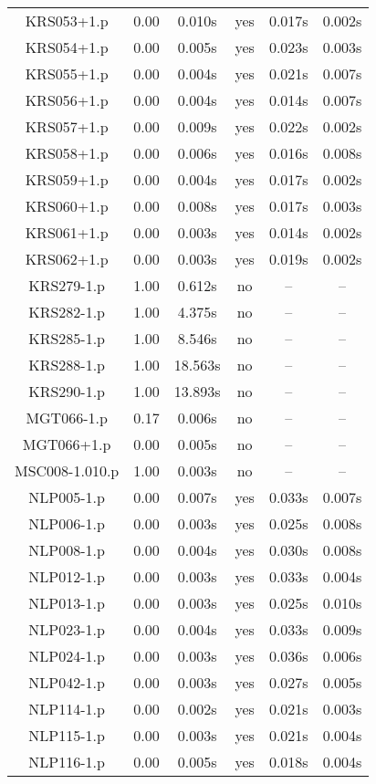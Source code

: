 \begin{longtable}{||c | c | c | c | c | c||}
KRS053+1.p & 0.00 & 0.010s & yes & 0.017s & 0.002s \\
KRS054+1.p & 0.00 & 0.005s & yes & 0.023s & 0.003s \\
KRS055+1.p & 0.00 & 0.004s & yes & 0.021s & 0.007s \\
KRS056+1.p & 0.00 & 0.004s & yes & 0.014s & 0.007s \\
KRS057+1.p & 0.00 & 0.009s & yes & 0.022s & 0.002s \\
KRS058+1.p & 0.00 & 0.006s & yes & 0.016s & 0.008s \\
KRS059+1.p & 0.00 & 0.004s & yes & 0.017s & 0.002s \\
KRS060+1.p & 0.00 & 0.008s & yes & 0.017s & 0.003s \\
KRS061+1.p & 0.00 & 0.003s & yes & 0.014s & 0.002s \\
KRS062+1.p & 0.00 & 0.003s & yes & 0.019s & 0.002s \\
KRS279-1.p & 1.00 & 0.612s & no & -- & -- \\
KRS282-1.p & 1.00 & 4.375s & no & -- & -- \\
KRS285-1.p & 1.00 & 8.546s & no & -- & -- \\
KRS288-1.p & 1.00 & 18.563s & no & -- & -- \\
KRS290-1.p & 1.00 & 13.893s & no & -- & -- \\
MGT066-1.p & 0.17 & 0.006s & no & -- & -- \\
MGT066+1.p & 0.00 & 0.005s & no & -- & -- \\
MSC008-1.010.p & 1.00 & 0.003s & no & -- & -- \\
NLP005-1.p & 0.00 & 0.007s & yes & 0.033s & 0.007s \\
NLP006-1.p & 0.00 & 0.003s & yes & 0.025s & 0.008s \\
NLP008-1.p & 0.00 & 0.004s & yes & 0.030s & 0.008s \\
NLP012-1.p & 0.00 & 0.003s & yes & 0.033s & 0.004s \\
NLP013-1.p & 0.00 & 0.003s & yes & 0.025s & 0.010s \\
NLP023-1.p & 0.00 & 0.004s & yes & 0.033s & 0.009s \\
NLP024-1.p & 0.00 & 0.003s & yes & 0.036s & 0.006s \\
NLP042-1.p & 0.00 & 0.003s & yes & 0.027s & 0.005s \\
NLP114-1.p & 0.00 & 0.002s & yes & 0.021s & 0.003s \\
NLP115-1.p & 0.00 & 0.003s & yes & 0.021s & 0.004s \\
NLP116-1.p & 0.00 & 0.005s & yes & 0.018s & 0.004s \\

\end{longtable}
